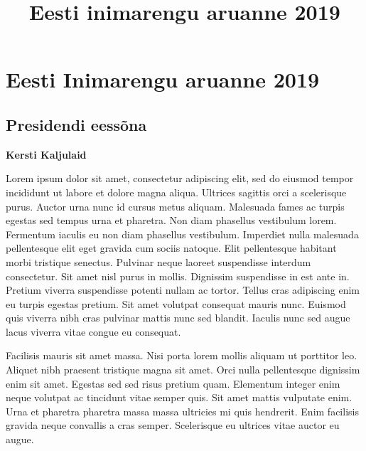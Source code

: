 \documentclass[estonian,]{article}
\title{Eesti inimarengu aruanne 2019}
\author{}
\date{\vspace{-2.5em}}
\begin{document}
\maketitle

{
\setcounter{tocdepth}{2}
\tableofcontents
}
\hypertarget{eesti-inimarengu-aruanne-2019}{%
\section*{Eesti Inimarengu aruanne 2019}\label{eesti-inimarengu-aruanne-2019}}

\hypertarget{presidendi-eessuxf5na}{%
\subsection*{Presidendi eessõna}\label{presidendi-eessuxf5na}}

\begin{authors}
\textbf{Kersti Kaljulaid}
\end{authors}

Lorem ipsum dolor sit amet, consectetur adipiscing elit, sed do eiusmod tempor incididunt ut labore et dolore magna aliqua. Ultrices sagittis orci a scelerisque purus. Auctor urna nunc id cursus metus aliquam. Malesuada fames ac turpis egestas sed tempus urna et pharetra. Non diam phasellus vestibulum lorem. Fermentum iaculis eu non diam phasellus vestibulum. Imperdiet nulla malesuada pellentesque elit eget gravida cum sociis natoque. Elit pellentesque habitant morbi tristique senectus. Pulvinar neque laoreet suspendisse interdum consectetur. Sit amet nisl purus in mollis. Dignissim suspendisse in est ante in. Pretium viverra suspendisse potenti nullam ac tortor. Tellus cras adipiscing enim eu turpis egestas pretium. Sit amet volutpat consequat mauris nunc. Euismod quis viverra nibh cras pulvinar mattis nunc sed blandit. Iaculis nunc sed augue lacus viverra vitae congue eu consequat.

Facilisis mauris sit amet massa. Nisi porta lorem mollis aliquam ut porttitor leo. Aliquet nibh praesent tristique magna sit amet. Orci nulla pellentesque dignissim enim sit amet. Egestas sed sed risus pretium quam. Elementum integer enim neque volutpat ac tincidunt vitae semper quis. Sit amet mattis vulputate enim. Urna et pharetra pharetra massa massa ultricies mi quis hendrerit. Enim facilisis gravida neque convallis a cras semper. Scelerisque eu ultrices vitae auctor eu augue.
\end{document}

